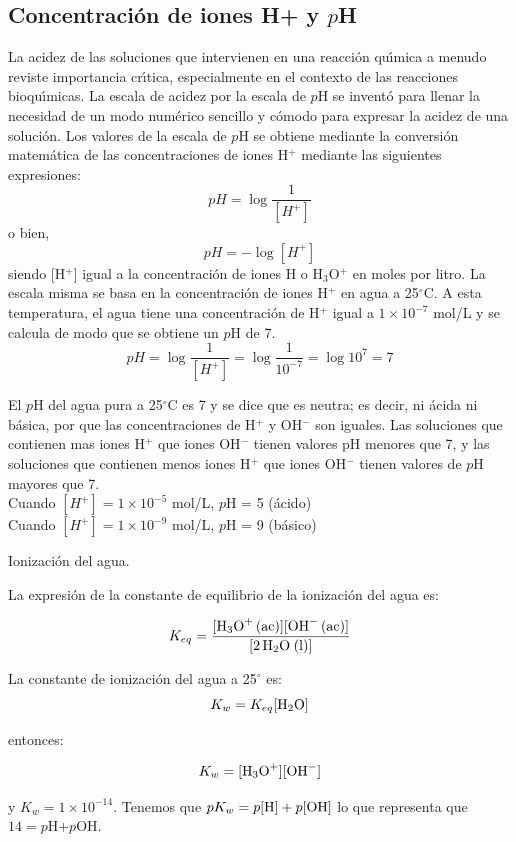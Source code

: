 \subsection{Concentraci\'on de iones H+ y $p$H}
La acidez de las soluciones que intervienen en una reacci\'on qu\'{\i}mica a menudo reviste importancia cr\'{\i}tica, especialmente en el contexto de las reacciones bioqu\'{\i}micas.  La escala de acidez por la escala de  $p$H se invent\'o para llenar la necesidad de un modo num\'erico sencillo y c\'omodo para expresar la acidez de una soluci\'on. Los valores de la escala de $p$H se obtiene mediante la conversi\'on matem\'atica de las concentraciones de iones H$^+$ mediante las siguientes expresiones:
\begin{equation}
pH = \log \frac{1}{[H^+]}
\end{equation}
o bien,
\begin{equation}
 pH = -\log [H^+]
\label{ph:1}
\end{equation}
 siendo  [H$^+$] igual a la concentraci\'on de iones  H o  H$_3$O$^+$ en moles
por litro. La escala misma se basa en la concentraci\'on de iones H$^+$
en agua a 25$^\circ$C. A esta temperatura, el agua tiene una
concentraci\'on de H$^+$ igual a $1\times10^{-7}$ mol/L y se calcula de
modo que se obtiene un $p$H de 7.
$$
pH = \log \frac{1}{[H^+]}=\log \frac{1}{10^{-7}}=\log 10^7 = 7
$$

El $p$H del agua pura a 25$^\circ$C es 7 y se dice que es neutra; es
decir, ni \'acida ni b\'asica, por que las concentraciones de H$^+$ y
OH$^-$ son iguales. Las soluciones que contienen mas iones H$^+$ que
iones OH$^-$ tienen valores pH menores que 7, y las soluciones que
contienen menos iones H$^+$ que iones OH$^-$ tienen valores de $p$H
mayores que 7.\\
Cuando $[H^+] = 1\times 10^{-5}$ mol/L, $p$H = 5 (\'acido)\\
Cuando $[H^+] = 1\times 10^{-9}$ mol/L, $p$H = 9 (b\'asico)

\begin{ejemplo}{Ionizaci\'on del agua.}
\begin{center}
\end{center}

La expresi\'on de la constante de equilibrio de la ionizaci\'on del agua es:

\begin{equation}
  K_{eq} = \frac{[\ce{H3O+ (ac)}][\ce{OH^- (ac)}]}{[\ce{2H2O (l)}]} 
\end{equation}

La constante de ionizaci\'on del agua a 25$^\circ$ es:
\begin{equation}
  K_w = K_{eq} [\ce{H2O}]
\end{equation}

entonces:

\begin{equation}
 K_w = [\ce{H3O^+}][\ce{OH^-}]
\end{equation}

y $ K_w = 1\times 10^{-14}$. Tenemos que  $pK_w = p[\ce{H}]  + p[\ce{OH}] $  lo que representa que  $14 = p$H$ + p$OH.
\end{ejemplo}

